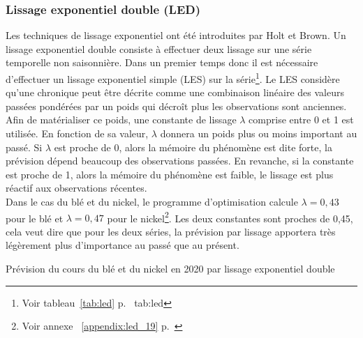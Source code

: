 \subsubsection*{Lissage exponentiel double (LED)}
Les techniques de lissage exponentiel ont été introduites par Holt et Brown. Un lissage exponentiel double consiste à effectuer deux lissage sur une série temporelle 
non saisonnière. Dans un premier temps donc il est nécessaire d'effectuer un lissage exponentiel simple (LES) sur la série\footnote{Voir tableau~\ref{tab:led} p.~\pageref
{tab:led}}. Le LES considère qu'une chronique peut être décrite comme une combinaison linéaire des valeurs passées pondérées par un poids qui décroît plus les observations 
sont anciennes. \\[11pt]
Afin de matérialiser ce poids, une  constante de lissage $\lambda$ comprise entre 0 et 1 est utilisée. En fonction de sa valeur, $\lambda$ donnera un poids plus ou moins 
important au passé. Si $ \lambda $ est proche de 0, alors la mémoire du phénomène est dite forte, la prévision dépend beaucoup des observations passées. En revanche, si la 
constante est proche de 1, alors la mémoire du phénomène est faible, le lissage est plus réactif aux observations récentes.\\[11pt]
Dans le cas du blé et du nickel, le programme d'optimisation calcule $ \lambda = 0,43 $ pour le blé et $ \lambda = 0,47 $ pour le nickel\footnote{Voir annexe ~\ref{appendix:led_19} p.~\pageref{appendix:led_19} }. Les deux constantes sont
proches de 0,45, cela veut dire que pour les deux séries, la prévision par lissage apportera très légèrement plus d'importance au passé que au présent.
\begin{table}[H]
    \centering
    \caption{Prévision du cours du blé et du nickel en 2020 par lissage exponentiel double}
    \sffamily
    
\end{table}



